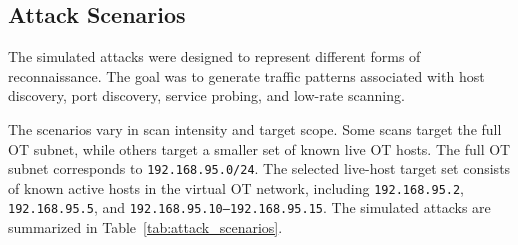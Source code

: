 \subsection{Attack Scenarios}
The simulated attacks were designed to represent different forms of reconnaissance. The goal was to generate traffic patterns associated with host discovery, port discovery, service probing, and low-rate scanning. 

The scenarios vary in scan intensity and target scope. Some scans target the full OT subnet, while others target a smaller set of known live OT hosts. The full OT subnet corresponds to \texttt{192.168.95.0/24}. The selected live-host target set consists of known active hosts in the virtual OT network, including \texttt{192.168.95.2}, \texttt{192.168.95.5}, and
\texttt{192.168.95.10--192.168.95.15}. The simulated attacks are summarized in Table~\ref{tab:attack_scenarios}.

\begin{table}[h]
    
    \centering
    \caption{Overview of simulated reconnaissance attack types.}
    \label{tab:attack_scenarios}
\end{table}

